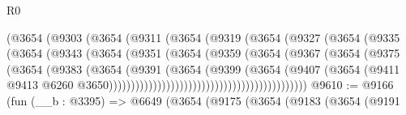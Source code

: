 \begin{lexlean}{R0}
\begin{coremodule}
                                  (@3654
                                    (@9303
                                      (@3654
                                        (@9311
                                          (@3654
                                            (@9319
                                              (@3654
                                                (@9327
                                                  (@3654
                                                    (@9335
                                                      (@3654
                                                        (@9343
                                                          (@3654
                                                            (@9351
                                                              (@3654
                                                                (@9359
                                                                  (@3654
                                                                    (@9367
                                                                      (@3654
                                                                        (@9375
                                                                          (@3654
                                                                            (@9383
                                                                              (@3654
                                                                                (@9391
                                                                                  (@3654
                                                                                    (@9399
                                                                                      (@3654
                                                                                        (@9407
                                                                                          (@3654
                                                                                            (@9411
                                                                                              @9413
                                                                                              @6260
                                                                                              @3650)))))))))))))))))))))))))))))))))))))))))))))
@9610 := @9166
    (fun (__b : @3395) =>
    @6649
      (@3654
        (@9175
          (@3654
            (@9183
              (@3654
                (@9191

\end{coremodule}
\end{lexlean}
